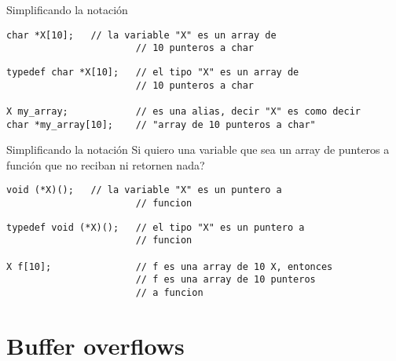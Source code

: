 \begin{frame}[fragile]{Simplificando la notaci\'on}{}
         \begin{lstlisting}[style=normal]
        char *X[10];   // la variable "X" es un array de 
                       // 10 punteros a char

         \end{lstlisting}
         \begin{lstlisting}[style=normal]
typedef char *X[10];   // el tipo "X" es un array de 
                       // 10 punteros a char

X my_array;            // es una alias, decir "X" es como decir
char *my_array[10];    // "array de 10 punteros a char"

         \end{lstlisting}
\end{frame}
\begin{frame}[fragile]{Simplificando la notaci\'on}{}
Si quiero una variable que sea un array de punteros a funci\'on que no reciban ni retornen nada?
         \begin{lstlisting}[style=normal]
        void (*X)();   // la variable "X" es un puntero a 
                       // funcion

         \end{lstlisting}
         \begin{lstlisting}[style=normal]
typedef void (*X)();   // el tipo "X" es un puntero a 
                       // funcion

X f[10];               // f es una array de 10 X, entonces
                       // f es una array de 10 punteros 
                       // a funcion
         \end{lstlisting}
\end{frame}

\section{Buffer overflows}
